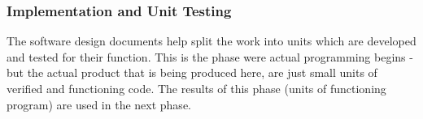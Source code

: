 \subsubsection{Implementation and Unit Testing}

The software design documents help split the work into units which are developed and tested 
for their function. This is the phase were actual programming begins - but the actual 
product that is being produced here, are just small units of verified and functioning 
code\cite{waterfallexplained}. The results of this phase (units of functioning program) are 
used in the next phase\cite{waterfallexplained}.